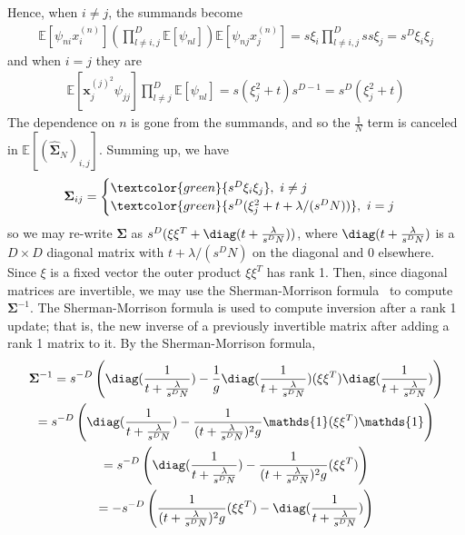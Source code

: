         Hence, when $i\neq j$, the summands become
        \begin{align*}
            \mathds{E}[\psi_{ni}x^{(n)}_i] (\prod_{l\neq i,j}^D \mathds{E}[\psi_{nl}]) \mathds{E}[\psi_{nj}x^{(n)}_j] = s\xi_i \prod_{l\neq i,j}^D s s\xi_j = s^D \xi_i \xi_j
        \end{align*}
        and when $i=j$ they are
        \begin{align*}
            \mathds{E}[\mathbf{x}^{{(j)}^2}_j \psi_{jj}] \prod_{l\neq j}^D \mathds{E}[\psi_{nl}] = s(\xi_j^2 + t)s^{D-1} = s^D (\xi_j^2 + t)
        \end{align*}
        The dependence on $n$ is gone from the summands, and so the $\frac{1}{N}$ term is canceled in $\mathds{E}[(\hat{\mathbf{\Sigma}}_N)_{i,j}]$. Summing up, we have
            $$
            \mathbf{\Sigma}_{ij} =
            \begin{cases}
           \textcolor{green}{s^D\xi_i \xi_j},\ i \neq j\\
           \textcolor{green}{s^D(\xi_j^2 + t + \lambda/(s^D N))},\ i = j\\
            \end{cases}
            $$
            so we may re-write $\mathbf{\Sigma}$ as $s^D(\xi \xi^T + \diag(t + \frac{\lambda}{s^D N}))$, where $\diag(t + \frac{\lambda}{s^D N})$ is a $D\times D$ diagonal matrix with $t + \lambda/(s^D N)$ on the diagonal and $0$ elsewhere. 
           Since $\xi$ is a fixed vector the outer product $\xi \xi^T$ has rank 1. Then, since diagonal matrices are invertible, we may use the Sherman-Morrison formula~\citep{sherman50adjustment} to compute $\mathbf{\Sigma}^{-1}$. The Sherman-Morrison formula is used to compute inversion after a rank 1 update; that is, the new inverse of a previously invertible matrix after adding a rank 1 matrix to it. By the Sherman-Morrison formula,
           \begin{gather*}
           \mathbf{\Sigma}^{-1}=s^{-D}\left(\diag(\frac{1}{t + \frac{\lambda}{s^D N}})-\frac{1}{g}\diag(\frac{1}{t + \frac{\lambda}{s^D N}})(\xi \xi^T)\diag(\frac{1}{t + \frac{\lambda}{s^D N}})\right) \\
           = s^{-D}\left(\diag(\frac{1}{t + \frac{\lambda}{s^D N}})-\frac{1}{(t + \frac{\lambda}{s^D N })^2g}\mathds{1}(\xi \xi^T)\mathds{1}\right) \\
           = s^{-D}\left(\diag(\frac{1}{t + \frac{\lambda}{s^D N}})-\frac{1}{(t+\frac{\lambda}{s^D N})^2g}(\xi \xi^T)\right) \\
           = -s^{-D}\left(\frac{1}{(t+\frac{\lambda}{s^D N})^2g}(\xi \xi^T)-\diag(\frac{1}{t + \frac{\lambda}{s^D N}})\right)
           \end{gather*}
